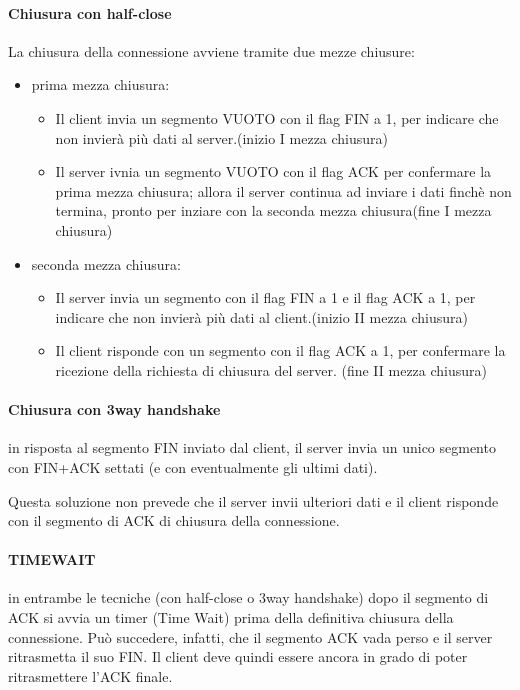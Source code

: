 \paragraph{Chiusura con half-close}
La chiusura della connessione avviene tramite due mezze chiusure:
\begin{itemize}
    \item prima mezza chiusura:
    \begin{itemize}
            \item Il client invia un segmento VUOTO con il flag FIN a 1, per indicare che non invierà più dati al server.(inizio I mezza chiusura) 
            \item Il server  ivnia un segmento VUOTO con il flag ACK per confermare la prima mezza chiusura; allora il server continua ad inviare i dati finchè non termina, pronto per inziare con la seconda mezza chiusura(fine I mezza chiusura)
    \end{itemize}
    \item seconda mezza chiusura:
    \begin{itemize}
            \item Il server invia un segmento con il flag FIN a 1 e il flag ACK a 1, per indicare che non invierà più dati al client.(inizio II mezza chiusura) 
            \item Il client risponde con un segmento con il flag ACK a 1, per confermare la ricezione della richiesta di chiusura del server. (fine II mezza chiusura)
    \end{itemize}
\end{itemize} 


\newpage
\paragraph{Chiusura con 3way handshake}

in risposta al segmento FIN inviato
dal client, il server invia un unico segmento con
FIN+ACK settati (e con eventualmente gli ultimi
dati).

Questa soluzione non prevede che il server invii
ulteriori dati e il client risponde con il segmento di ACK di
chiusura della connessione.



\paragraph{TIMEWAIT}
in entrambe le tecniche (con
half-close o 3way handshake) dopo il segmento
di ACK si avvia un timer (Time Wait) prima della
definitiva chiusura della connessione. Può
succedere, infatti, che il segmento ACK vada
perso e il server ritrasmetta il suo FIN. Il client
deve quindi essere ancora in grado di poter
ritrasmettere l'ACK finale.

